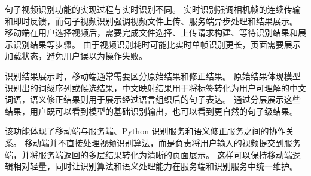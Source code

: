 句子视频识别功能的实现过程与实时识别不同。
实时识别强调相机帧的连续传输和即时反馈，而句子视频识别强调视频文件上传、服务端异步处理和结果展示。
移动端在用户选择视频后，需要完成文件选择、上传请求构建、等待识别结果和展示识别结果等步骤。
由于视频识别耗时可能比实时单帧识别更长，页面需要展示加载状态，避免用户误以为操作失败。

识别结果展示时，移动端通常需要区分原始结果和修正结果。
原始结果体现模型识别出的词级序列或候选结果，中文映射结果用于将标签转化为用户可理解的中文词语，语义修正结果则用于展示经过语言组织后的句子表达。
通过分层展示这些结果，用户既可以看到模型的基础识别输出，也可以看到更自然的句子级结果。

该功能体现了移动端与服务端、Python 识别服务和语义修正服务之间的协作关系。
移动端并不直接处理视频识别算法，而是负责将用户输入的视频提交到服务端，并将服务端返回的多层结果转化为清晰的页面展示。
这样可以保持移动端逻辑相对轻量，同时让识别算法和语义处理能力在服务端和识别服务中统一维护。
